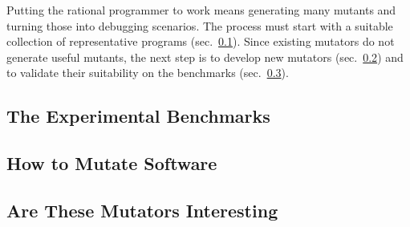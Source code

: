 
Putting the rational programmer to work means generating many mutants and turning
those into debugging scenarios. The process must start with a suitable
collection of representative programs (sec.~\ref{sub:mutate-benchmarks}).
Since existing mutators do not generate useful mutants, the next step is to
develop new mutators (sec.~\ref{sub:mutate-mutators}) and to validate their
suitability on the benchmarks (sec.~\ref{sub:mutate-interesting}).

\def\sub#1#2{\subsection{#2} \label{sub:mutate-#1} }


\sub{benchmarks}{The Experimental Benchmarks}

\sub{mutators}   {How to Mutate Software} 
\sub{interesting}{Are These Mutators Interesting} 
